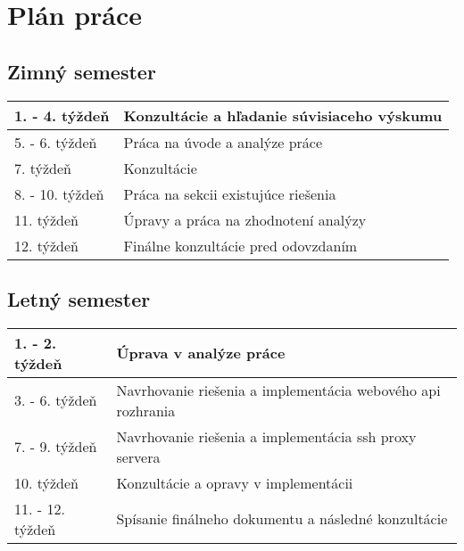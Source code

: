 \chapter{Plán práce}

\renewcommand*{\thepage}{A\arabic{page}}

\section{Zimný semester}

\begin{tabular}{|l||l|}
\hline
1. - 4. týždeň & Konzultácie a hľadanie súvisiaceho výskumu  \\
\hline
5. - 6. týždeň & Práca na úvode a analýze práce  \\
\hline
7. týždeň & Konzultácie  \\
\hline
8. - 10. týždeň & Práca na sekcii existujúce riešenia  \\
\hline
11. týždeň & Úpravy a práca na zhodnotení analýzy \\
\hline
12. týždeň & Finálne konzultácie pred odovzdaním \\
\hline
\end{tabular}

\section{Letný semester}

\begin{tabular}{|l||l|}
\hline
1. - 2. týždeň & Úprava v analýze práce \\
\hline
3. - 6. týždeň & Navrhovanie riešenia a implementácia webového api rozhrania\\
\hline
7. - 9. týždeň & Navrhovanie riešenia a implementácia ssh proxy servera \\
\hline
10. týždeň & Konzultácie a opravy v implementácii  \\
\hline
11. - 12. týždeň & Spísanie finálneho dokumentu a následné konzultácie  \\
\hline
\end{tabular}
